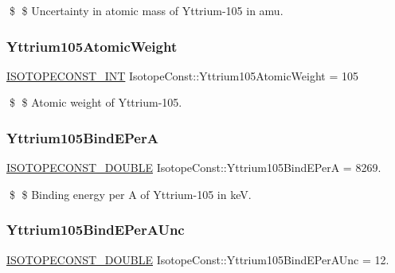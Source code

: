 \$ \$ Uncertainty in atomic mass of Yttrium-\/105 in amu. \mbox{\label{group___isotope_const-_yttrium-_y105_ga41fd3de1f986faf565423ec02a608d8a}} 
\subsubsection{\texorpdfstring{Yttrium105\+Atomic\+Weight}{Yttrium105AtomicWeight}}
{\footnotesize\ttfamily \mbox{\hyperlink{group___isotope_const-_macros_ga5f18360b3e99483a35c32d789e62621c}{I\+S\+O\+T\+O\+P\+E\+C\+O\+N\+S\+T\+\_\+\+I\+NT}} Isotope\+Const\+::\+Yttrium105\+Atomic\+Weight = 105}

\$ \$ Atomic weight of Yttrium-\/105. \mbox{\label{group___isotope_const-_yttrium-_y105_gad74e1e82f785c843b49955d608df3a85}} 
\subsubsection{\texorpdfstring{Yttrium105\+Bind\+E\+PerA}{Yttrium105BindEPerA}}
{\footnotesize\ttfamily \mbox{\hyperlink{group___isotope_const-_macros_ga8f45a7272ce02c0b4c65c44636ed719a}{I\+S\+O\+T\+O\+P\+E\+C\+O\+N\+S\+T\+\_\+\+D\+O\+U\+B\+LE}} Isotope\+Const\+::\+Yttrium105\+Bind\+E\+PerA = 8269.}

\$ \$ Binding energy per A of Yttrium-\/105 in keV. \mbox{\label{group___isotope_const-_yttrium-_y105_ga7e1eb243dbd8abba5d36d969816fd478}} 
\subsubsection{\texorpdfstring{Yttrium105\+Bind\+E\+Per\+A\+Unc}{Yttrium105BindEPerAUnc}}
{\footnotesize\ttfamily \mbox{\hyperlink{group___isotope_const-_macros_ga8f45a7272ce02c0b4c65c44636ed719a}{I\+S\+O\+T\+O\+P\+E\+C\+O\+N\+S\+T\+\_\+\+D\+O\+U\+B\+LE}} Isotope\+Const\+::\+Yttrium105\+Bind\+E\+Per\+A\+Unc = 12.}

